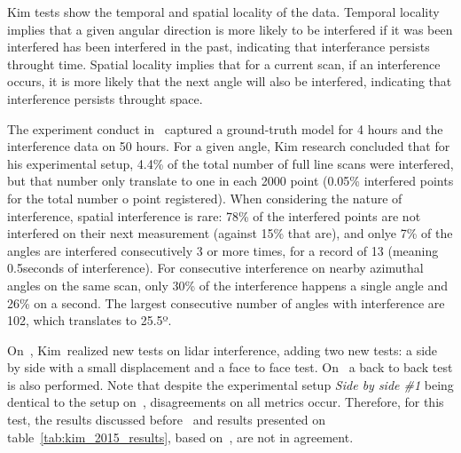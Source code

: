Kim \etal tests show the temporal and spatial locality of the data. Temporal locality implies that a given angular direction is more likely to be interfered if it was been interfered has been interfered in the past, indicating that interferance persists throught time. Spatial locality implies that for a current scan, if an interference occurs, it is more likely that the next angle will also be interfered, indicating that interference persists throught space. 



The experiment conduct in~\cite{Kim2015a} captured a ground-truth model for 4 hours and the interference data on 50 hours. For a given angle, Kim research concluded that for his experimental setup, 4.4\% of the total number of full line scans were interfered, but that number only translate to one in each 2000 point (0.05\% interfered points for the total number o point registered). When considering the nature of interference, spatial interference is rare: 78\% of the interfered points are not interfered on their next measurement (against 15\% that are), and onlye 7\% of the angles are interfered consecutively 3 or more times, for a record of 13 (meaning 0.5seconds of interference). For consecutive interference on nearby azimuthal angles on the same scan, only 30\% of the interference happens a single angle and 26\% on a second. The largest consecutive number of angles with interference are 102, which translates to 25.5º.


On~\cite{Kim2015b}, Kim~\etal realized new tests on \ac{lidar} interference, adding two new tests: a side by side with a small displacement and a face to face test. On~\cite{Kim2015c} a back to back test is also performed. Note that despite the experimental setup \textit{Side by side \#1} being dentical to the setup on~\cite{Kim2015a}, disagreements on all metrics occur. Therefore, for this test, the results discussed before~\cite{Kim2015a} and results presented on table~\ref{tab:kim_2015_results}, based on~\cite{Kim2015b, Kim2015c}, are not in agreement.

